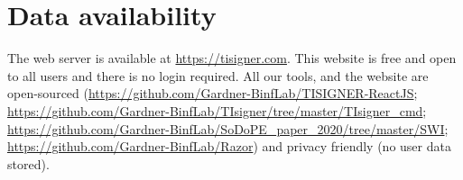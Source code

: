 \section{Data availability}

The web server is available at \href{https://tisigner.com}{https://tisigner.com}. This website is free
and open to all users and there is no login required. All our tools, and the website 
are open-sourced (\href{https://github.com/Gardner-BinfLab/TISIGNER-ReactJS}{https://github.com/Gardner-BinfLab/TISIGNER-ReactJS};\\ \href{https://github.com/Gardner-BinfLab/TIsigner/tree/master/TIsigner\_cmd}{https://github.com/Gardner-BinfLab/TIsigner/tree/master/TIsigner\_cmd};\\ \href{https://github\\.com/Gardner-BinfLab/SoDoPE\_paper\_2020/tree/master/SWI}{https://github.com/Gardner-BinfLab/SoDoPE\_paper\_2020/tree/master/SWI};\\ \href{https://github.com/Gardner-BinfLab/Razor}{https://github.com/Gardner-BinfLab/Razor}) and privacy friendly (no user data stored).




